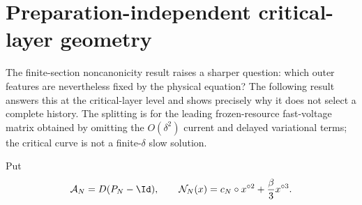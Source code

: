 \section{Preparation-independent critical-layer geometry}
\label{sec:unprepared-outer-skeleton}

The finite-section noncanonicity result raises a sharper question: which
outer features are nevertheless fixed by the physical equation?  The
following result answers this at the critical-layer level and shows precisely
why it does not select a complete history.  The splitting is for the leading
frozen-resource fast-voltage matrix obtained by omitting the
\(O(\delta^2)\) current and delayed variational terms; the critical curve is
not a finite-\(\delta\) slow solution.

Put
\begin{equation}
 \mathcal A_N=D(P_N-\Id),\qquad
 \mathcal N_N(x)=c_N\circ x^{\circ2}
              +\frac\beta3x^{\circ3}.                 \label{eq:outer-fast-nonlinearity}
\end{equation}

